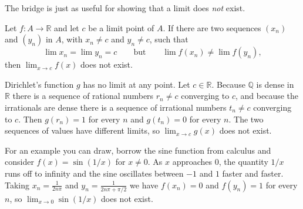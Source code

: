 The bridge is just as useful for showing that a limit does \emph{not} exist.

\begin{corollary}\label{cor:divergence-criterion}
Let $f : A \to \mathbb{R}$ and let $c$ be a limit point of $A$.  If there are two sequences $(x_n)$ and $(y_n)$ in $A$, with $x_n \neq c$ and $y_n \neq c$, such that
\[ \lim x_n = \lim y_n = c \qquad \text{but} \qquad \lim f(x_n) \neq \lim f(y_n), \]
then $\lim_{x \to c} f(x)$ does not exist.
\end{corollary}

\begin{example}
Dirichlet's function $g$ has no limit at any point.  Let $c \in \mathbb{R}$.  Because $\mathbb{Q}$ is dense in $\mathbb{R}$ there is a sequence of rational numbers $r_n \neq c$ converging to $c$, and because the irrationals are dense there is a sequence of irrational numbers $t_n \neq c$ converging to $c$.  Then $g(r_n) = 1$ for every $n$ and $g(t_n) = 0$ for every $n$.  The two sequences of values have different limits, so $\lim_{x \to c} g(x)$ does not exist.
\end{example}

\begin{example}
For an example you can draw, borrow the sine function from calculus and consider $f(x) = \sin(1/x)$ for $x \neq 0$.  As $x$ approaches $0$, the quantity $1/x$ runs off to infinity and the sine oscillates between $-1$ and $1$ faster and faster.  Taking $x_n = \frac{1}{2n\pi}$ and $y_n = \frac{1}{2n\pi + \pi/2}$ we have $f(x_n) = 0$ and $f(y_n) = 1$ for every $n$, so $\lim_{x \to 0} \sin(1/x)$ does not exist.
\end{example}

\begin{marginfigure}
\centering
{}
\caption{The graph of $\sin(1/x)$.  Near $0$ it visits every height between $-1$ and $1$ infinitely often and settles on none of them.}
\end{marginfigure}

